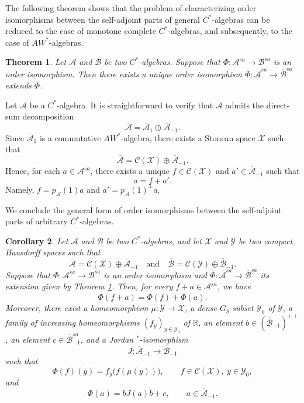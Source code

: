 \documentclass[12pt]{amsart}
\newtheorem{thm}{Theorem}[section]
\newtheorem{cor}[thm]{Corollary}
\theoremstyle{definition}
\theoremstyle{remark}
\numberwithin{equation}{section}
\begin{document}
The following theorem shows that the problem of characterizing order isomorphisms between the self-adjoint parts of general $C^*$-algebras can be reduced to the case of monotone complete $C^*$-algebras, and subsequently, to the case of $AW^*$-algebras.




\begin{thm}\label{extension}
Let $\mathcal{A}$ and  $\mathcal{B}$ be two  $C^*$-algebras. Suppose that $\Phi: \mathcal{A}^{sa}\to \mathcal{B}^{sa}$ is an order isomorphism. Then  there exists  a  unique  order isomorphism  $\overline{\Phi}:{\overline{\mathcal{A}}}^{sa}\to \overline{\mathcal{B}}^{sa}$ extends $\Phi$.  
\end{thm}






Let $\mathcal{A}$ be a $C^{*}$-algebra. It is straightforward to verify that $\overline{\mathcal{A}}$ admits the direct-sum decomposition
$$
\overline{\mathcal{A}}=\overline{\mathcal{A}}_{1}\oplus \overline{\mathcal{A}}_{-1}.
$$
Since $\overline{\mathcal{A}}_{1}$ is a commutative $AW^{*}$-algebra, there exists a Stonean space $\mathcal{X}$ such that
$$
\overline{\mathcal{A}}=\mathcal{C}(\mathcal{X})\oplus \overline{\mathcal{A}}_{-1}.
$$
Hence,  for each $a\in\mathcal{A}^{sa}$, there exists a unique $f\in\mathcal{C}(\mathcal{X})$ and $a'\in\overline{\mathcal{A}}_{-1}$ such that $$a=f+a'.$$
Namely, $f=p_\mathcal{A}(1)a$ and $a'=p_\mathcal{A}(1)^\perp a$.

 We conclude the general form of order isomorphisms between the self-adjoint parts of arbitrary $C^*$-algebras. 


\begin{cor}\label{main-cor}
	Let $\mathcal{A}$ and $\mathcal{B}$ be two $C^*$-algebras, and let $\mathcal{X}$ and $\mathcal{Y}$ be two compact Hausdorff spaces such that 
	$$
	\overline{\mathcal{A}} = \mathcal{C}(\mathcal{X}) \oplus \overline{\mathcal{A}}_{-1}
	\quad \text{and} \quad
	\overline{\mathcal{B}} = \mathcal{C}(\mathcal{Y}) \oplus \overline{\mathcal{B}}_{-1}.
	$$
	Suppose that $\Phi: \mathcal{A}^{sa} \to \mathcal{B}^{sa}$ is an order isomorphism and  $\overline{\Phi}:{\overline{\mathcal{A}}}^{sa}\to \overline{\mathcal{B}}^{sa}$ its extension given by Theorem \ref{extension}. Then, for every $f+a\in\mathcal{A}^{sa}$, we have 
	$$
	\Phi(f + a) = \overline{\Phi}(f) + \overline{\Phi}(a).
	$$
Moreover, there exist a homeomorphism $\mu: \mathcal{Y} \to \mathcal{X}$, a dense $G_\delta$-subset $\mathcal{Y}_{0}$ of $\mathcal{Y}$, a family of increasing homeomorphisms $(f_y)_{y \in \mathcal{Y}_{0}}$ of $\mathbb{R}$, an element $b \in  (\overline{\mathcal{B}}_{-1})^{++}$, an element $c \in  \overline{\mathcal{B}}_{-1}^{sa}$, and a Jordan $^*$-isomorphism 
	$$J: \overline{\mathcal{A}}_{-1} \to \overline{\mathcal{B}}_{-1}$$
	such that 
	$$
	\Phi(f)(y) = f_y\big(f(\mu(y))\big), 
	\qquad 
	f \in \mathcal{C}(\mathcal{X}), \ y \in \mathcal{Y}_{0},
	$$
	and 
	$$
	\Phi(a) = b J(a) b + c, 
	\qquad 
	a \in \overline{\mathcal{A}}_{-1}.
	$$
\end{cor}
\end{document}

